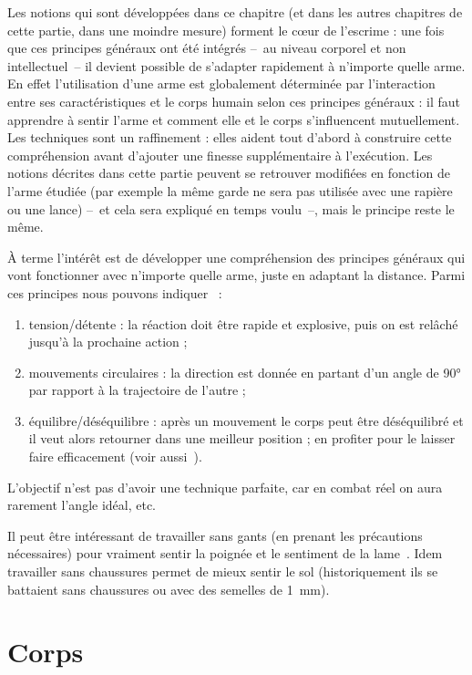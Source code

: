 Les notions qui sont développées dans ce chapitre (et dans les autres chapitres de cette partie, dans une moindre mesure) forment le cœur de l'escrime : une fois que ces principes généraux ont été intégrés -- au niveau corporel et non intellectuel -- il devient possible de s'adapter rapidement à n'importe quelle arme.
En effet l'utilisation d'une arme est globalement déterminée par l'interaction entre ses caractéristiques et le corps humain selon ces principes généraux : il faut apprendre à sentir l'arme et comment elle et le corps s'influencent mutuellement.
Les techniques sont un raffinement : elles aident tout d'abord à construire cette compréhension avant d'ajouter une finesse supplémentaire à l'exécution.
Les notions décrites dans cette partie peuvent se retrouver modifiées en fonction de l'arme étudiée (par exemple la même garde ne sera pas utilisée avec une rapière ou une lance) -- et cela sera expliqué en temps voulu --, mais le principe reste le même.

À terme l'intérêt est de développer une compréhension des principes généraux qui vont fonctionner avec n'importe quelle arme, juste en adaptant la distance.
Parmi ces principes nous pouvons indiquer~\cite{enzi:dijon:messer_inner:2015} :
\begin{enumerate}
	\item tension/détente : la réaction doit être rapide et explosive, puis on est relâché jusqu'à la prochaine action ;
	\item mouvements circulaires : la direction est donnée en partant d'un angle de 90° par rapport à la trajectoire de l'autre ;
	\item équilibre/déséquilibre : après un mouvement le corps peut être déséquilibré et il veut alors retourner dans une meilleur position ; en profiter pour le laisser faire efficacement (voir aussi~\cite{guidoux:dijon:thibault:2015}).
\end{enumerate}
L'objectif n'est pas d'avoir une technique parfaite, car en combat réel on aura rarement l'angle idéal, etc.

Il peut être intéressant de travailler sans gants (en prenant les précautions nécessaires) pour vraiment sentir la poignée et le sentiment de la lame~\cite{enzi:dijon:messer_inner:2015}.
Idem travailler sans chaussures permet de mieux sentir le sol (historiquement ils se battaient sans chaussures ou avec des semelles de \SI{1}{mm}).


\section{Corps}


